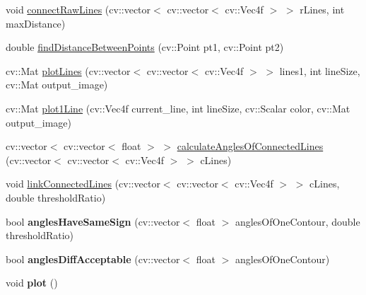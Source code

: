 \begin{DoxyCompactItemize}
\item 
void \hyperlink{classLinkedLines_a920f9ae9cb013c393a555c6c6c922d73}{connectRawLines} (cv::vector$<$ cv::vector$<$ cv::Vec4f $>$ $>$ rLines, int maxDistance)
\item 
double \hyperlink{classLinkedLines_aefaa75421b85c98299f8d4d2a956216a}{findDistanceBetweenPoints} (cv::Point pt1, cv::Point pt2)
\item 
cv::Mat \hyperlink{classLinkedLines_ada95097dbf8ad3b4f1b18b42f3920a54}{plotLines} (cv::vector$<$ cv::vector$<$ cv::Vec4f $>$ $>$ lines1, int lineSize, cv::Mat output\_\-image)
\item 
cv::Mat \hyperlink{classLinkedLines_a7696b39387ac832b1b174c484e1c5dcd}{plot1Line} (cv::Vec4f current\_\-line, int lineSize, cv::Scalar color, cv::Mat output\_\-image)
\item 
cv::vector$<$ cv::vector$<$ float $>$ $>$ \hyperlink{classLinkedLines_a96aa89f80cc4441cc4b2a4bc916c9d4a}{calculateAnglesOfConnectedLines} (cv::vector$<$ cv::vector$<$ cv::Vec4f $>$ $>$ cLines)
\item 
void \hyperlink{classLinkedLines_a8c4e2755a3b9d05a6910618578caf3d2}{linkConnectedLines} (cv::vector$<$ cv::vector$<$ cv::Vec4f $>$ $>$ cLines, double thresholdRatio)
\item 
\hypertarget{classLinkedLines_a0d59af2fa932c4ee8794cc77d49b213f}{
bool {\bfseries anglesHaveSameSign} (cv::vector$<$ float $>$ anglesOfOneContour, double thresholdRatio)}
\label{classLinkedLines_a0d59af2fa932c4ee8794cc77d49b213f}

\item 
\hypertarget{classLinkedLines_acd0687a6f9435e8e6dd09b4bb0bfa7d6}{
bool {\bfseries anglesDiffAcceptable} (cv::vector$<$ float $>$ anglesOfOneContour)}
\label{classLinkedLines_acd0687a6f9435e8e6dd09b4bb0bfa7d6}

\item 
\hypertarget{classLinkedLines_afc3743816a40009d8b085b57c0776b9d}{
void {\bfseries plot} ()}
\label{classLinkedLines_afc3743816a40009d8b085b57c0776b9d}

\end{DoxyCompactItemize}
